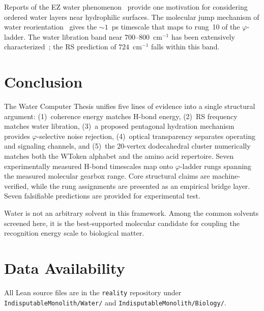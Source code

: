 \documentclass[12pt,a4paper]{article}
\theoremstyle{definition}
\theoremstyle{remark}
\begin{document}
Reports of the EZ water phenomenon~\cite{Pollack2013} provide one
motivation for considering ordered water layers near hydrophilic
surfaces.  The
molecular jump mechanism of water reorientation~\cite{Laage2006}
gives the $\sim 1$~ps timescale that maps to rung~10 of the
$\varphi$-ladder.  The water libration band near $700$--$800$~cm$^{-1}$
has been extensively characterized~\cite{Walrafen1972}; the RS
prediction of $724$~cm$^{-1}$ falls within this band.

\section{Conclusion}
\label{sec:conclusion}

The Water Computer Thesis unifies five lines of evidence into a single
structural argument: (1)~coherence energy matches H-bond energy,
(2)~RS frequency matches water libration, (3)~a proposed pentagonal
hydration mechanism provides $\varphi$-selective noise rejection,
(4)~optical transparency separates operating and signaling channels,
and (5)~the 20-vertex dodecahedral cluster numerically matches both the
WToken alphabet and the amino acid repertoire.
Seven experimentally measured H-bond timescales map onto $\varphi$-ladder
rungs spanning the measured molecular gearbox range.  Core structural
claims are machine-verified, while the rung assignments are presented as
an empirical bridge layer.  Seven falsifiable predictions are provided
for experimental test.

Water is not an arbitrary solvent in this framework.  Among the common
solvents screened here, it is the best-supported molecular candidate
for coupling the recognition energy scale to biological matter.

\section*{Data Availability}
All Lean source files are in the \texttt{reality} repository under
\texttt{IndisputableMonolith/Water/} and
\texttt{IndisputableMonolith/Biology/}.
\end{document}
